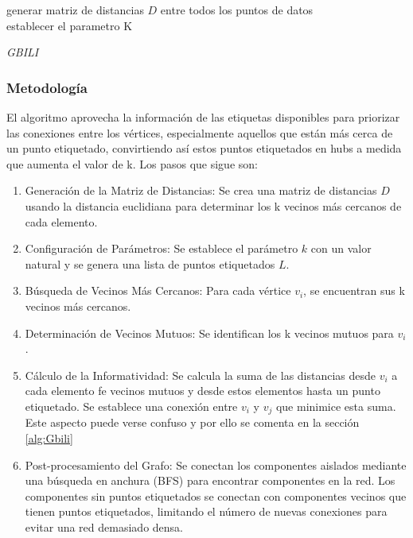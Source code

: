 \begin{algorithm}
	\label{alg:Gbili}
	\BlankLine
	generar matriz de distancias $D$ entre todos los puntos de datos\\
	establecer el parametro K\\
	\caption{\textit{GBILI}}
\end{algorithm}

\subsubsection{Metodología}
El algoritmo aprovecha la información de las etiquetas disponibles para priorizar las conexiones entre los vértices, especialmente aquellos que están más cerca de un punto etiquetado, convirtiendo así estos puntos etiquetados en hubs a medida que aumenta el valor de k.
Los pasos que sigue son:
\begin{enumerate}
	\item Generación de la Matriz de Distancias: Se crea una matriz de distancias $D$ usando la distancia euclidiana para determinar los k vecinos más cercanos de cada elemento.
	\item Configuración de Parámetros: Se establece el parámetro $k$ con un valor natural y se genera una lista de puntos etiquetados	$L$.
	\item Búsqueda de Vecinos Más Cercanos: Para cada vértice $v_i$, se encuentran sus k vecinos más cercanos.
	\item Determinación de Vecinos Mutuos: Se identifican los k vecinos mutuos para $v_i$.
	\item Cálculo de la Informatividad: Se calcula la suma de las distancias desde $v_i$ a cada elemento fe vecinos mutuos y desde estos elementos hasta un punto etiquetado. Se establece una conexión entre $v_i$ y $v_j$ que minimice esta suma. Este aspecto puede verse confuso y por ello se comenta en la sección \ref{alg:Gbili} %
	\item Post-procesamiento del Grafo: Se conectan los componentes aislados mediante una búsqueda en anchura (BFS) para encontrar componentes en la red. Los componentes sin puntos etiquetados se conectan con componentes vecinos que tienen puntos etiquetados, limitando el número de nuevas conexiones para evitar una red demasiado densa.
\end{enumerate}

